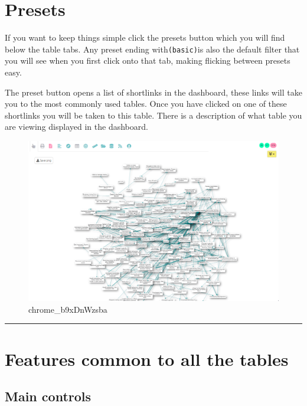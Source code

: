 \documentclass[
]{book}
\begin{document}
\hypertarget{preset-tables}{%
\section{Presets}\label{preset-tables}}

If you want to keep things simple click the presets button which you will find below the table tabs. Any preset ending with\texttt{(basic)}is also the default filter that you will see when you first click onto that tab, making flicking between presets easy.

The preset button opens a list of shortlinks in the dashboard, these links will take you to the most commonly used tables. Once you have clicked on one of these shortlinks you will be taken to this table. There is a description of what table you are viewing displayed in the dashboard.

\begin{figure}
\centering
\includegraphics[width=6.77083in,height=\textheight]{_assets/chrome_b9xDnWzsba.gif}
\caption{chrome\_b9xDnWzsba}
\end{figure}

\begin{center}\rule{0.5\linewidth}{0.5pt}\end{center}

\hypertarget{tables_common}{%
\section{Features common to all the tables}\label{tables_common}}

\hypertarget{main-controls-1}{%
\subsection{Main controls}\label{main-controls-1}}
\end{document}
